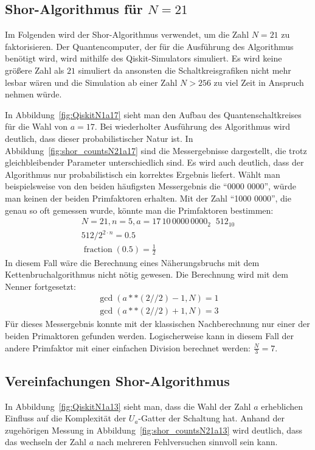 \documentclass[a4paper,journal]{IEEEtran}
\DeclareMathOperator{\fraction}{fraction}
\DeclareMathOperator{\eqq}{\widehat{=}}
\begin{document}
\subsection{Shor-Algorithmus für \(N = 21\)}
Im Folgenden wird der Shor-Algorithmus verwendet,
um die Zahl \(N = 21\) zu faktorisieren.
Der Quantencomputer, der für die Ausführung des Algorithmus benötigt wird,
wird mithilfe des Qiskit-Simulators simuliert.
Es wird keine größere Zahl als \(21\) simuliert
da ansonsten die Schaltkreisgrafiken nicht mehr lesbar wären und
die Simulation ab einer Zahl \(N > 256\) zu viel Zeit in Anspruch nehmen würde.

In Abbildung~\ref{fig:QiskitN1a17} sieht man den Aufbau des Quantenschaltkreises
für die Wahl von \(a = 17\).
Bei wiederholter Ausführung des Algorithmus wird deutlich,
dass dieser probabilistischer Natur ist.
In Abbildung~\ref{fig:shor_countsN21a17} sind die Messergebnisse dargestellt,
die trotz gleichbleibender Parameter unterschiedlich sind.
Es wird auch deutlich, dass der Algorithmus nur probabilistisch ein korrektes Ergebnis liefert.
Wählt man beispielsweise von den beiden häufigsten Messergebnis die "`0000 0000"',
würde man keinen der beiden Primfaktoren erhalten.
Mit der Zahl "`1000 0000"', die  genau so oft gemessen wurde, könnte man die Primfaktoren bestimmen:
\begin{equation*}
\begin{split}
  N = 21,
  n = 5,
  a = 17\,10\,0000\,0000_2 \eqq 512_{10}\\
  512/2^{2\cdot n} = 0.5\\
  \fraction(0.5) = \frac{1}{2}
\end{split}
\end{equation*}
In diesem Fall wäre die Berechnung eines Näherungsbruchs mit dem Kettenbruchalgorithmus nicht nötig gewesen.
Die Berechnung wird mit dem Nenner fortgesetzt:
\begin{equation*}
\begin{split}
  \gcd(a**(2//2)-1, N) = 1\\
  \gcd(a**(2//2)+1, N) = 3
\end{split}
\end{equation*}
Für dieses Messergebnis konnte mit der klassischen Nachberechnung
nur einer der beiden Primaktoren gefunden werden.
Logischerweise kann in diesem Fall der andere Primfaktor mit einer einfachen Division berechnet werden:
\(\frac{N}{3} = 7\).

\subsection{Vereinfachungen Shor-Algorithmus}
In Abbildung~\ref{fig:QiskitN1a13} sieht man,
dass die Wahl der Zahl \(a\) erheblichen Einfluss auf die Komplexität der \(U_a\)-Gatter der Schaltung hat.
Anhand der zugehörigen Messung in Abbildung~\ref{fig:shor_countsN21a13} wird deutlich,
dass das wechseln der Zahl \(a\) nach mehreren Fehlversuchen sinnvoll sein kann.
\end{document}
